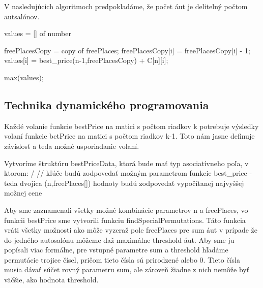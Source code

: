 \documentclass[paper=a4, fontsize=11pt]{scrartcl} %
\numberwithin{equation}{section} %
\numberwithin{figure}{section} %
\numberwithin{table}{section} %
\begin{document}
V nasledujúcich algoritmoch predpokladáme, že počet áut je delitelný počtom autsalónov. \ \\

\begin{algorithmic}[1]
        \State {}
    \EndIf

    \State values = [] of number

            \State freePlacesCopy = copy of freePlaces;			
            \State	freePlacesCopy[i] = freePlacesCopy[i] - 1;			
            \State values[i] = best\_price(n-1,freePlacesCopy) + C[n][i];
        \EndIf
    \EndFor

    \State \Return max(values);
\EndFunction
\end{algorithmic}

\subsection*{Technika dynamického programovania}

Každé volanie funkcie bestPrice na matici s počtom riadkov k potrebuje  výsledky volaní funkcie betPrice na matici s počtom riadkov k-1. Toto nám jasne definuje závislosť  a teda možné usporiadanie volaní.

Vytvoríme štruktúru bestPriceData, ktorá  bude mať typ asociatívneho poľa, v ktorom: / //
kľúče budú zodpovedať možným parametrom funkcie best\_price - teda dvojica (n,freePlaces[])
hodnoty budú zodpovedať vypočítanej najvyššej možnej cene


Aby sme zaznamenali všetky možné kombinácie parametrov n a freePlaces, vo funkcii bestPrice sme vytvorili funkciu findSpecialPermutations. Táto funkcia vráti všetky možnosti ako môže vyzeraž pole freePlaces pre sum áut v prípade že do jedného autosalónu môžeme daž maximálne threshold áut. 
Aby sme ju popísali viac formálne, pre vstupné parametre sum a threshold hľadáme permutácie trojice čísel, pričom tieto čísla sú prirodzené alebo 0. Tieto čísla musia dávať súčet rovný parametru sum, ale zároveň žiadne z nich nemôže byť väčšie, ako hodnota threshold. \ \\
\end{document}
